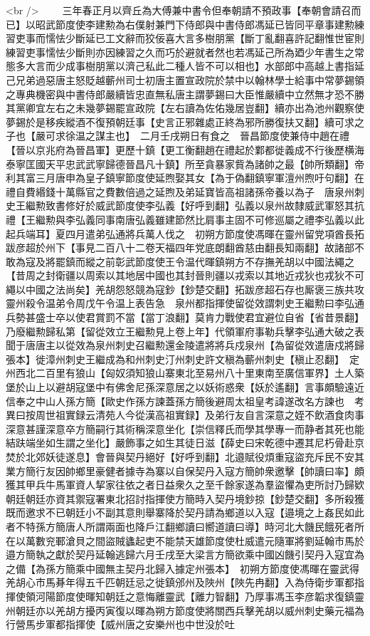 <br />
　　三年春正月以齊丘為大傅兼中書令但奉朝請不預政事【奉朝會請召而已】以昭武節度使李建勲為右僕射兼門下侍郎與中書侍郎馮延已皆同平章事建勲練習吏事而懦怯少斷延已工文辭而狡佞喜大言多樹朋黨【斷丁亂翻喜許記翻惟世宦則練習吏事懦怯少斷則亦因練習之久而巧於避就者然也若馮延己所為廼少年書生之常態多大言而少成事樹朋黨以濟己私此二種人皆不可以相也】水部郎中高越上書指延己兄弟過惡唐主怒貶越蘄州司士初唐主置宣政院於禁中以翰林學士給事中常夢錫領之專典機密與中書侍郎嚴續皆忠直無私唐主謂夢錫曰大臣惟嚴續中立然無才恐不勝其黨卿宜左右之未幾夢錫罷宣政院【左右讀為佐佑幾居豈翻】續亦出為池州觀察使夢錫於是移疾縱酒不復預朝廷事【史言正邪雜處正終為邪所勝復扶又翻】續可求之子也【嚴可求徐温之謀主也】　二月壬戌朔日有食之　晉昌節度使兼侍中趙在禮【晉以京兆府為晉昌軍】更歷十鎮【更工衡翻趙在禮起於鄴都徙義成不行後歷横海泰寧匡國天平忠武武寧歸德晉昌凡十鎮】所至貪暴家貲為諸帥之最【帥所類翻】帝利其富三月唐申為皇子鎮寧節度使延煦娶其女【為于偽翻鎮寧軍澶州煦吁句翻】在禮自費緡錢十萬縣官之費數倍過之延煦及弟延寶皆高祖諸孫帝養以為子　唐泉州刺史王繼勲致書修好於威武節度使李弘義【好呼到翻】弘義以泉州故隸威武軍怒其抗禮【王繼勲與李弘義同事南唐弘義雖建節然比肩事主固不可修巡屬之禮李弘義以此起兵端耳】夏四月遣弟弘通將兵萬人伐之　初朔方節度使馮暉在靈州留党項酋長拓跋彦超於州下【事見二百八十二卷天福四年党底朗翻酋慈由翻長知兩翻】故諸部不敢為寇及將罷鎮而縱之前彰武節度使王令温代暉鎮朔方不存撫羌胡以中國法繩之【昔周之封衛疆以周索以其地居中國也其封晉則疆以戎索以其地近戎狄也戎狄不可繩以中國之法尚矣】羌胡怨怒競為寇鈔【鈔楚交翻】拓跋彦超石存也厮褒三族共攻靈州殺令温弟令周戊午令温上表告急　泉州都指揮使留從效謂刺史王繼勲曰李弘通兵勢甚盛士卒以使君賞罰不當【當丁浪翻】莫肯力戰使君宜避位自省【省昔景翻】乃廢繼勲歸私第【留從效立王繼勲見上卷上年】代領軍府事勒兵擊李弘通大破之表聞于唐唐主以從效為泉州刺史召繼勲還金陵遣將將兵戍泉州【為留從效遣唐戍將歸張本】徙漳州刺史王繼成為和州刺史汀州刺史許文稹為蘄州刺史【稹止忍翻】　定州西北二百里有狼山【匈奴須知狼山寨東北至易州八十里東南至廣信軍界】土人築堡於山上以避胡寇堡中有佛舍尼孫深意居之以妖術惑衆【妖於遙翻】言事頗驗遠近信奉之中山人孫方簡【歐史作孫方諫蓋孫方簡後避周太祖皇考諱遂改名方諫也　考異曰按周世祖實録云清苑人今從漢高祖實録】及弟行友自言深意之姪不飲酒食肉事深意甚謹深意卒方簡嗣行其術稱深意坐化【崇信釋氏而學其學專一而静者其死也能結趺端坐如生謂之坐化】嚴飾事之如生其徒日滋【薛史曰宋乾德中遷其尼朽骨赴京焚於北郊妖徒遂息】會晉與契丹絕好【好呼到翻】北邉賦役煩重寇盜充斥民不安其業方簡行友因帥鄉里豪健者據寺為寨以自保契丹入寇方簡帥衆邀擊【帥讀曰率】頗獲其甲兵牛馬軍資人挈家往依之者日益衆久之至千餘家遂為羣盜懼為吏所討乃歸欵朝廷朝廷亦資其禦寇署東北招討指揮使方簡時入契丹境鈔掠【鈔楚交翻】多所殺獲既而邀求不已朝廷小不副其意則舉寨降於契丹請為鄉道以入寇【邉境之上姦民如此者不特孫方簡唐人所謂兩面也降戶江翻鄉讀曰嚮道讀曰導】時河北大饑民餓死者所在以萬數兖鄆滄貝之間盜賊蠭起吏不能禁天雄節度使杜威遣元隨軍將劉延翰市馬於邉方簡執之獻於契丹延翰逃歸六月壬戌至大梁言方簡欲乘中國凶饑引契丹入寇宜為之備【為孫方簡乘中國無主契丹北歸入據定州張本】　初朔方節度使馮暉在靈武得羌胡心市馬朞年得五千匹朝廷忌之徙鎮邠州及陜州【陜先冉翻】入為侍衛步軍都指揮使領河陽節度使暉知朝廷之意悔離靈武【離力智翻】乃厚事馮玉李彦韜求復鎮靈州朝廷亦以羌胡方擾丙寅復以暉為朔方節度使將關西兵擊羌胡以威州刺史藥元福為行營馬步軍都指揮使【威州唐之安樂州也中世没於吐